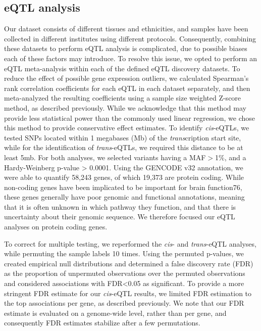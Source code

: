 \subsection{eQTL analysis}
Our dataset consists of different tissues and ethnicities, and samples have been collected in different institutes using different protocols. Consequently, combining these datasets to perform eQTL analysis is complicated, due to possible biases each of these factors may introduce. To resolve this issue, we opted to perform an eQTL meta-analysis within each of the defined eQTL discovery datasets. To reduce the effect of possible gene expression outliers, we calculated Spearman’s rank correlation coefficients for each eQTL in each dataset separately, and then meta-analyzed the resulting coefficients using a sample size weighted Z-score method, as described previously\cite{vosaUnravelingPolygenicArchitecture2018}. While we acknowledge that this method may provide less statistical power than the commonly used linear regression, we chose this method to provide conservative effect estimates. To identify \textit{cis}-eQTLs, we tested SNPs located within 1 megabases (Mb) of the \textit{trans}cription start site, while for the identification of \textit{trans}-eQTLs, we required this distance to be at least 5mb. For both analyses, we selected variants having a MAF$>$1\%, and a Hardy-Weinberg p-value > 0.0001. Using the GENCODE v32 annotation, we were able to quantify 58,243 genes, of which 19,373 are protein coding. While non-coding genes have been implicated to be important for brain function76, these genes generally have poor genomic and functional annotations, meaning that it is often unknown in which pathway they function, and that there is uncertainty about their genomic sequence. We therefore focused our eQTL analyses on protein coding genes. 

To correct for multiple testing, we reperformed the \textit{cis}- and \textit{trans}-eQTL analyses, while permuting the sample labels 10 times. Using the permuted p-values, we created empirical null distributions and determined a false discovery rate (FDR) as the proportion of unpermuted observations over the permuted observations and considered associations with FDR<0.05 as significant. To provide a more stringent FDR estimate for our \textit{cis}-eQTL results, we limited FDR estimation to the top associations per gene, as described previously\cite{vosaUnravelingPolygenicArchitecture2018}. We note that our FDR estimate is evaluated on a genome-wide level, rather than per gene, and consequently FDR estimates stabilize after a few permutations\cite{westraSystematicIdentificationTranseQTLs2013}. 

